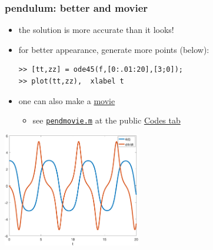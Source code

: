 \documentclass[dvipsnames,colorlinks]{beamer}
\begin{document}
\begin{frame}[fragile]
\frametitle{pendulum: better and movier}

\small
\begin{itemize}
\item the solution is more accurate than it looks!
\item for better appearance, generate more points (below):
\begin{Verbatim}[fontsize=\small]
>> [tt,zz] = ode45(f,[0:.01:20],[3;0]);
>> plot(tt,zz),  xlabel t
\end{Verbatim}
\item one can also make a \href{https://bueler.github.io/math302/assets/codes/S19/pendmovie.gif}{movie}
    \begin{itemize}
    \item see \href{https://bueler.github.io/math302/assets/codes/F23/pendmovie.m}{\texttt{pendmovie.m}} at the public \href{https://bueler.github.io/math302/codes.html}{Codes tab}
    \end{itemize}
\end{itemize}

\includegraphics[width=0.45\textwidth]{figs/pend-smooth}
\end{frame}
\end{document}
